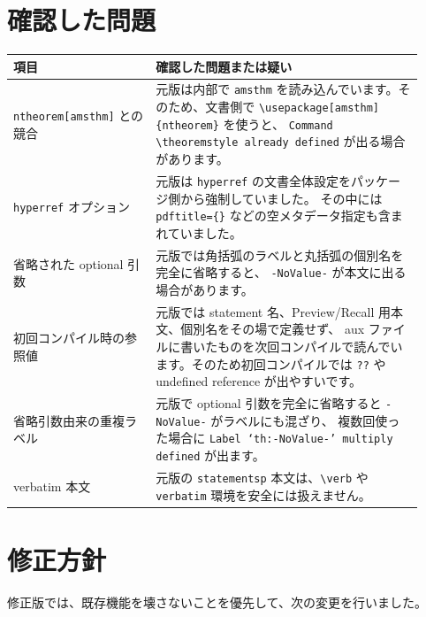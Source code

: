 \documentclass{ltjsarticle}
\begin{document}
\section{確認した問題}

\begin{tabular}{p{0.32\linewidth}p{0.6\linewidth}}
\toprule
項目 & 確認した問題または疑い \\
\midrule
\texttt{ntheorem[amsthm]} との競合 &
元版は内部で \texttt{amsthm} を読み込んでいます。そのため、文書側で
\texttt{\textbackslash usepackage[amsthm]\{ntheorem\}} を使うと、
\texttt{Command \textbackslash theoremstyle already defined} が出る場合があります。 \\
\texttt{hyperref} オプション &
元版は \texttt{hyperref} の文書全体設定をパッケージ側から強制していました。
その中には \texttt{pdftitle=\{\}} などの空メタデータ指定も含まれていました。 \\
省略された optional 引数 &
元版では角括弧のラベルと丸括弧の個別名を完全に省略すると、
\texttt{-NoValue-} が本文に出る場合があります。 \\
初回コンパイル時の参照値 &
元版では statement 名、Preview/Recall 用本文、個別名をその場で定義せず、
aux ファイルに書いたものを次回コンパイルで読んでいます。そのため初回コンパイルでは
\texttt{??} や undefined reference が出やすいです。 \\
省略引数由来の重複ラベル &
元版で optional 引数を完全に省略すると \texttt{-NoValue-} がラベルにも混ざり、
複数回使った場合に \texttt{Label `th:-NoValue-' multiply defined} が出ます。 \\
verbatim 本文 &
元版の \texttt{statementsp} 本文は、\texttt{\textbackslash verb} や
\texttt{verbatim} 環境を安全には扱えません。 \\
\bottomrule
\end{tabular}

\section{修正方針}

修正版では、既存機能を壊さないことを優先して、次の変更を行いました。
\end{document}
